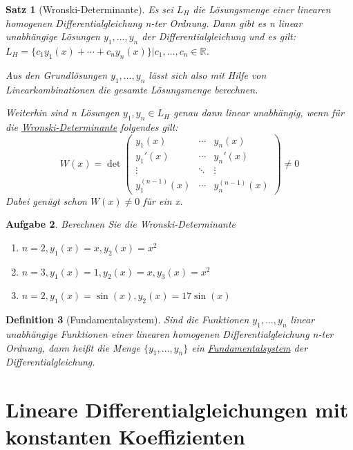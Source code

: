 \documentclass[fontset=ubuntu,12pt,a4paper]{scrreprt}
\newtheorem{defi}{Definition}[section]
\newtheorem{satz}[defi]{Satz}
\newtheorem{aufg}[defi]{Aufgabe}
\begin{document}
    \begin{satz}[Wronski-Determinante]
        Es sei \(L_H\) die Lösungsmenge einer linearen homogenen Differentialgleichung n-ter Ordnung. Dann gibt es n linear unabhängige Lösungen \(y_1,\dots,y_n\) der Differentialgleichung und es gilt: \(L_H=\{c_1y_1(x)+\cdots+c_n y_n(x)\}|c_1,\dots,c_n\in\mathbb{R}\).

        Aus den Grundlösungen \(y_1,\dots,y_n\) lässt sich also mit Hilfe von Linearkombinationen die gesamte Lösungsmenge berechnen.

        Weiterhin sind n Lösungen \(y_1,y_n \in L_H\) genau dann linear unabhängig, wenn für die \underline{Wronski-Determinante} folgendes gilt:
        \[W(x)=\det\begin{pmatrix}
            y_1(x) & \cdots & y_n(x) \\
            y_1'(x) & \cdots & y_n'(x) \\
            \vdots & \ddots & \vdots \\
            y_1^{(n-1)}(x) & \cdots & y_n^{(n-1)}(x)
        \end{pmatrix} \ne 0 \]
        Dabei genügt schon \(W(x) \ne 0\) für ein x.
    \end{satz}

    \begin{aufg}
        Berechnen Sie die Wronski-Determinante
        \begin{enumerate}[label=\emph{(\roman*)}]
            \item \(n=2,y_1(x)=x,y_2(x)=x^2\)
            \item \(n=3,y_1(x)=1,y_2(x)=x,y_3(x)=x^2\)
            \item \(n=2,y_1(x)=\sin(x),y_2(x)=17\sin(x)\)
        \end{enumerate}
    \end{aufg}

    \begin{defi}[Fundamentalsystem]
        Sind die Funktionen \(y_1,\dots,y_n\) linear unabhängige Funktionen einer linearen homogenen Differentialgleichung n-ter Ordnung, dann heißt die Menge \(\{y_1,\dots,y_n\}\) ein \underline{Fundamentalsystem} der Differentialgleichung.
    \end{defi}

    \section{Lineare Differentialgleichungen mit konstanten Koeffizienten}
\end{document}
